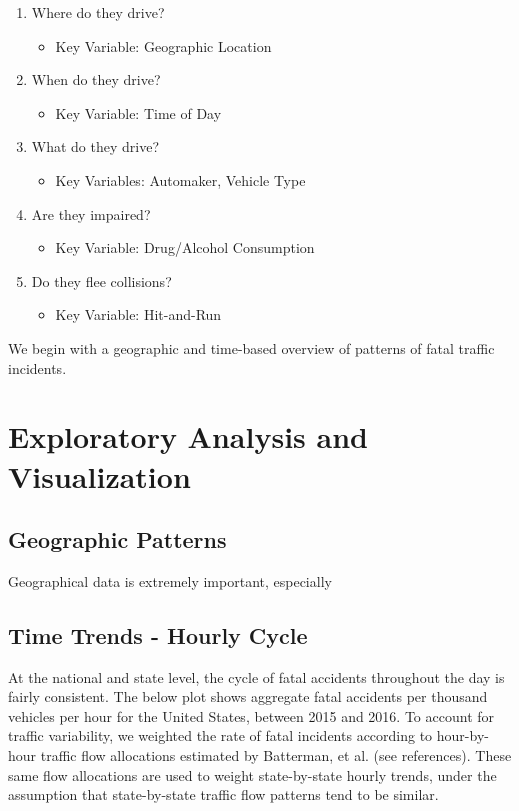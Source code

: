 \documentclass[11pt, oneside,titlepage]{article}   	%
\begin{document}
\begin{enumerate}
\item Where do they drive?
\begin{itemize}
\item Key Variable: Geographic Location
\end{itemize}
\item When do they drive?
\begin{itemize}
\item Key Variable: Time of Day
\end{itemize}
\item What do they drive?
\begin{itemize}
\item Key Variables: Automaker, Vehicle Type
\end{itemize}
\item Are they impaired?
\begin{itemize}
\item Key Variable: Drug/Alcohol Consumption
\end{itemize}
\item Do they flee collisions?
\begin{itemize}
\item Key Variable: Hit-and-Run
\end{itemize}
\end{enumerate}

We begin with a geographic and time-based overview of patterns of fatal traffic incidents.

\section*{Exploratory Analysis and Visualization}

\subsection*{Geographic Patterns}

Geographical data is extremely important, especially


\subsection*{Time Trends - Hourly Cycle}
At the national and state level, the cycle of fatal accidents throughout the day is fairly consistent. The below plot shows aggregate fatal accidents per thousand vehicles per hour for the United States, between 2015 and 2016. To account for traffic variability, we weighted the rate of fatal incidents according to hour-by-hour traffic flow allocations estimated by Batterman, et al. (see references). These same flow allocations are used to weight state-by-state hourly trends, under the assumption that state-by-state traffic flow patterns tend to be similar. \\
\end{document}
